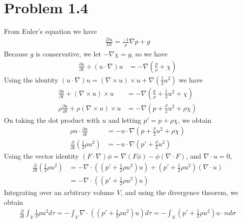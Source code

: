 \documentclass[12pt]{article}
\newcommand{\eq}[1]{\begin{align*}#1\end{align*}}
\newcommand{\p}[2]{\frac{\partial#1}{\partial#2}}
\begin{document}
\section*{Problem 1.4} From Euler's equation we have
\eq{
	\frac{Du}{Dt} = \frac{-1}{\rho}\nabla p + g
}
Because $g$ is conservative, we let $-\nabla \chi = g$, so we have
\eq{
	\p{u}{t} + (u\cdot\nabla)u &= -\nabla(\frac{p}{\rho} + \chi)
}
Using the identity $(u\cdot \nabla)u = (\nabla\times u)\times u + \nabla(\frac{1}{2}u^2)$ we have
\eq{
	\p{u}{t} + (\nabla \times u)\times u &= -\nabla(\frac{p}{\rho} + \frac{1}{2}u^2 + \chi)\\
	\rho\p{u}{t} + \rho(\nabla \times u)\times u &= -\nabla(p + \frac{\rho}{2}u^2 + \rho\chi)
}
On taking the dot product with $u$ and letting $p' = p + \rho\chi$, we obtain
\eq{
	\rho u \cdot\p{u}{t} &= -u\cdot\nabla(p + \frac{\rho}{2}u^2 + \rho\chi)\\
	\p{}{t}(\frac{1}{2}\rho u^2) &= -u\cdot\nabla(p' + \frac{\rho}{2}u^2)
}
Using the vector identity $(F\cdot \nabla)\phi = \nabla(F\phi) - \phi(\nabla \cdot F)$, and $\nabla \cdot u = 0$,
\eq{
	\p{}{t}(\frac{1}{2}\rho u^2) &= -\nabla\cdot((p' + \frac{1}{2}\rho u^2)u) + (p' + \frac{1}{2}\rho u^2)(\nabla \cdot u)\\
	&= -\nabla\cdot((p' + \frac{1}{2}\rho u^2)u)
}
Integrating over an arbitrary volume $V$, and using the divergence theorem, we obtain
\eq{
	\p{}{t}\int_V \frac{1}{2}\rho u^2d\tau = -\int_V \nabla\cdot((p' + \frac{1}{2}\rho u^2)u)d\tau = -\int_S (p' + \frac{1}{2}\rho u^2)u \cdot nd\sigma
}
\end{document}
